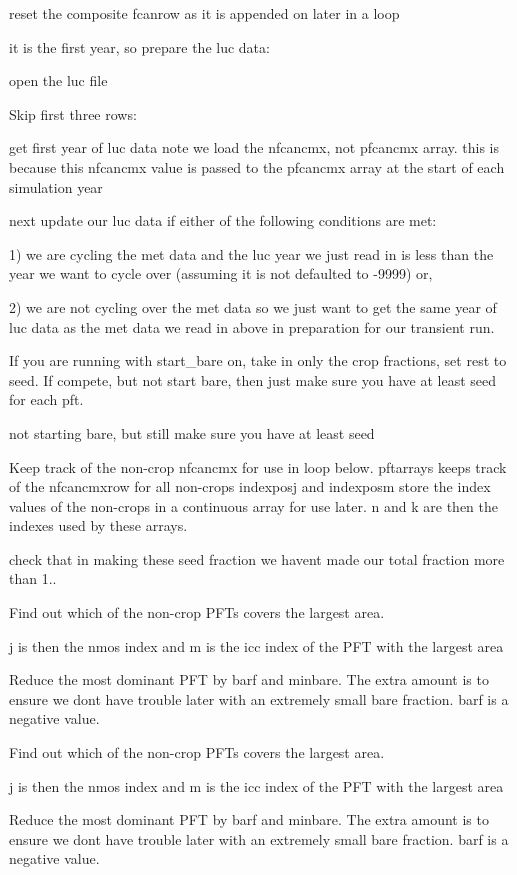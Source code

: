 reset the composite fcanrow as it is appended on later in a loop

it is the first year, so prepare the luc data\+:

open the luc file

Skip first three rows\+:

get first year of luc data note we load the nfcancmx, not pfcancmx array. this is because this nfcancmx value is passed to the pfcancmx array at the start of each simulation year

next update our luc data if either of the following conditions are met\+:

1) we are cycling the met data and the luc year we just read in is less than the year we want to cycle over (assuming it is not defaulted to -\/9999) or,

2) we are not cycling over the met data so we just want to get the same year of luc data as the met data we read in above in preparation for our transient run.

If you are running with start\+\_\+bare on, take in only the crop fractions, set rest to seed. If compete, but not start bare, then just make sure you have at least seed for each pft.

not starting bare, but still make sure you have at least seed

Keep track of the non-\/crop nfcancmx for use in loop below. pftarrays keeps track of the nfcancmxrow for all non-\/crops indexposj and indexposm store the index values of the non-\/crops in a continuous array for use later. n and k are then the indexes used by these arrays.

check that in making these seed fraction we haven\textquotesingle{}t made our total fraction more than 1..

Find out which of the non-\/crop P\+F\+Ts covers the largest area.

j is then the nmos index and m is the icc index of the P\+F\+T with the largest area

Reduce the most dominant P\+F\+T by barf and minbare. The extra amount is to ensure we don\textquotesingle{}t have trouble later with an extremely small bare fraction. barf is a negative value.

Find out which of the non-\/crop P\+F\+Ts covers the largest area.

j is then the nmos index and m is the icc index of the P\+F\+T with the largest area

Reduce the most dominant P\+F\+T by barf and minbare. The extra amount is to ensure we don\textquotesingle{}t have trouble later with an extremely small bare fraction. barf is a negative value.

